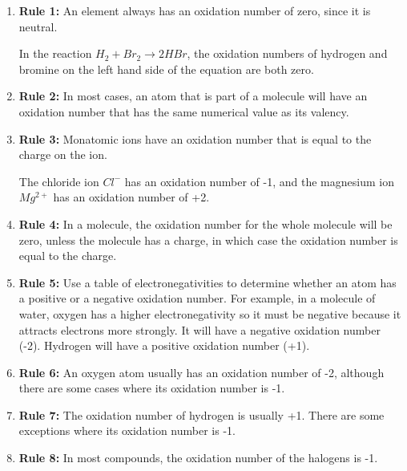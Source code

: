 \begin{enumerate}
\item{\textbf{Rule 1:} An element always has an oxidation number of zero, since it is neutral.

In the reaction \rm${H_{2} + Br_{2} \rightarrow 2HBr}$, the oxidation numbers of hydrogen and bromine on the left hand side of the equation are both zero.
}

\item{\textbf{Rule 2:} In most cases, an atom that is part of a molecule will have an oxidation number that has the same numerical value as its valency.}

\item{\textbf{Rule 3:} Monatomic ions have an oxidation number that is equal to the charge on the ion.

The chloride ion $Cl^{-}$ has an oxidation number of -1, and the magnesium ion $Mg^{2+}$ has an oxidation number of +2.
}
\item{\textbf{Rule 4:} In a molecule, the oxidation number for the whole molecule will be zero, unless the molecule has a charge, in which case the oxidation number is equal to the charge.}

\item{\textbf{Rule 5:} Use a table of electronegativities to determine whether an atom has a positive or a negative oxidation number. For example, in a molecule of water, oxygen has a higher electronegativity so it must be negative because it attracts electrons more strongly. It will have a negative oxidation number (-2). Hydrogen will have a positive oxidation number (+1).}

\item{\textbf{Rule 6:} An oxygen atom usually has an oxidation number of -2, although there are some cases where its oxidation number is -1.}

\item{\textbf{Rule 7:} The oxidation number of hydrogen is usually +1. There are some exceptions where its oxidation number is -1.}

\item{\textbf{Rule 8:} In most compounds, the oxidation number of the halogens is -1.}

\end{enumerate}


